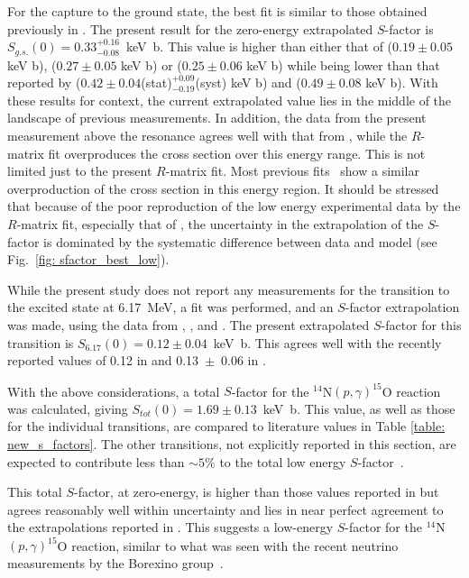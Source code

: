 For the capture to the ground state, the best fit is similar to those obtained previously in \citet{Li2016}. The present result for the zero-energy extrapolated $S$-factor is $S_{g.s.}(0) = 0.33_{-0.08}^{+0.16} $~keV~b. This value is higher than either that of \citet{Wagner2018} ($0.19 \pm 0.05$ keV b), \citet{Adelberger2011} ($0.27 \pm 0.05$ keV b) or \citet{Imbriani2005} ($0.25 \pm 0.06$ keV b) while being lower than that reported by \citet{Li2016} ($0.42 \pm 0.04$(stat)$^{+0.09}_{-0.19}$(syst) keV b) and \citet{Runkle2005} ($0.49 \pm 0.08$ keV b). With these results for context, the current extrapolated value lies in the middle of the landscape of previous measurements. In addition, the data from the present measurement above the resonance agrees well with that from \citet{Runkle2005}, while the $R$-matrix fit overproduces the cross section over this energy range. This is not limited just to the present $R$-matrix fit. Most previous fits~\cite{PhysRevC.67.065804, Imbriani2005, Azuma2010, Adelberger2011, Li2016, Wagner2018} show a similar overproduction of the cross section in this energy region.  It should be stressed that because of the poor reproduction of the low energy experimental data by the $R$-matrix fit, especially that of \citet{Imbriani2005}, the uncertainty in the extrapolation of the $S$-factor is dominated by the systematic difference between data and model (see Fig.~\ref{fig: sfactor_best_low}).

While the present study does not report any measurements for the transition to the excited state at 6.17~MeV, a fit was performed, and an $S$-factor extrapolation was made, using the data from \citet{Schroder1987}, \citet{Runkle2005}, and \citet{Imbriani2005}. The present extrapolated $S$-factor for this transition is $S_{6.17}(0) = 0.12 \pm 0.04$~keV~b. This agrees well with the recently reported values of 0.12 in \citet{Azuma2010} and 0.13~$\pm$~0.06 in \citet{Adelberger2011}.

With the above considerations, a total $S$-factor for the $^{14}$N$(p,\gamma)^{15}$O reaction was calculated, giving $S_{tot}(0) = 1.69 \pm 0.13$~keV~b. This value, as well as those for the individual transitions, are compared to literature values in Table \ref{table: new_s_factors}. The other transitions, not explicitly reported in this section, are expected to contribute less than $\sim5\%$ to the total low energy $S$-factor~\cite{Adelberger2011}. 

This total $S$-factor, at zero-energy, is higher than those values reported in \cite{Imbriani2005, Marta2008, Adelberger2011} but agrees reasonably well within uncertainty and lies in near perfect agreement to the extrapolations reported in \cite{Runkle2005, Angulo2005}. This suggests a low-energy $S$-factor for the $^{14}$N$(p,\gamma)^{15}$O reaction, similar to what was seen with the recent neutrino measurements by the Borexino group~\citet{agostini2020direct}. 



